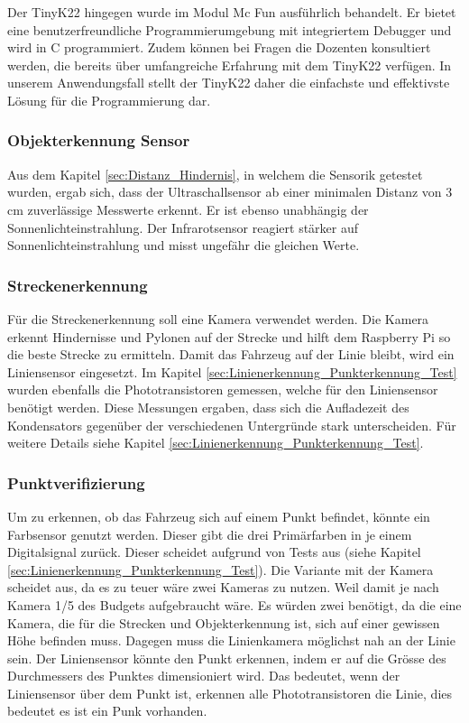 \documentclass[../main.tex]{subfiles}
\begin{document}
    Der TinyK22 hingegen wurde im Modul Mc Fun ausführlich behandelt. Er bietet eine benutzerfreundliche Programmierumgebung mit integriertem Debugger und wird in C programmiert. Zudem können bei Fragen die Dozenten konsultiert werden, die bereits über umfangreiche Erfahrung mit dem TinyK22 verfügen. In unserem Anwendungsfall stellt der TinyK22 daher die einfachste und effektivste Lösung für die Programmierung dar.


\subsubsection{Objekterkennung Sensor}
\label{a3:Objekterkennung_Sensor}
 Aus dem Kapitel \ref{sec:Distanz_Hindernis}, in welchem die Sensorik getestet wurden, ergab sich, dass der Ultraschallsensor ab einer minimalen Distanz von 3 cm zuverlässige Messwerte erkennt. Er ist ebenso unabhängig der Sonnenlichteinstrahlung. Der Infrarotsensor reagiert stärker auf Sonnenlichteinstrahlung und misst ungefähr die gleichen Werte. 



\subsubsection{Streckenerkennung}
Für die Streckenerkennung soll eine Kamera verwendet werden. Die Kamera erkennt Hindernisse und Pylonen auf der Strecke und hilft dem Raspberry Pi so die beste Strecke zu ermitteln. Damit das Fahrzeug auf der Linie bleibt, wird ein Liniensensor eingesetzt.  Im Kapitel \ref{sec:Linienerkennung_Punkterkennung_Test} wurden ebenfalls die Phototransistoren gemessen, welche für den Liniensensor benötigt werden. Diese Messungen ergaben, dass sich die Aufladezeit des Kondensators gegenüber der verschiedenen Untergründe stark unterscheiden. Für weitere Details siehe Kapitel \ref{sec:Linienerkennung_Punkterkennung_Test}. 

\subsubsection{Punktverifizierung}
Um zu erkennen, ob das Fahrzeug sich auf einem Punkt befindet, könnte ein Farbsensor genutzt werden. Dieser gibt die drei Primärfarben in je einem Digitalsignal zurück. Dieser scheidet aufgrund von Tests aus (siehe Kapitel \ref{sec:Linienerkennung_Punkterkennung_Test}). Die Variante mit der Kamera scheidet aus, da es zu teuer wäre zwei Kameras zu nutzen. Weil damit je nach Kamera 1/5 des Budgets aufgebraucht wäre. Es würden zwei benötigt, da die eine Kamera, die für die Strecken und Objekterkennung ist, sich auf einer gewissen Höhe befinden muss. Dagegen muss die Linienkamera möglichst nah an der Linie sein.
Der Liniensensor könnte den Punkt erkennen, indem er auf die Grösse des Durchmessers des Punktes dimensioniert wird. Das bedeutet, wenn der Liniensensor über dem Punkt ist, erkennen alle Phototransistoren die Linie, dies bedeutet es ist ein Punk vorhanden. 
\end{document}
